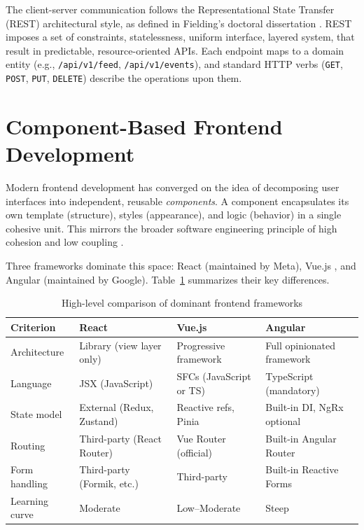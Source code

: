 The client-server communication follows the Representational State Transfer (REST) architectural style, as defined in Fielding's doctoral dissertation \cite{fielding2000rest}. REST imposes a set of constraints, statelessness, uniform interface, layered system, that result in predictable, resource-oriented APIs. Each endpoint maps to a domain entity (e.g., \texttt{/api/v1/feed}, \texttt{/api/v1/events}), and standard HTTP verbs (\texttt{GET}, \texttt{POST}, \texttt{PUT}, \texttt{DELETE}) describe the operations upon them.

\section{Component-Based Frontend Development}

Modern frontend development has converged on the idea of decomposing user interfaces into independent, reusable \textit{components}. A component encapsulates its own template (structure), styles (appearance), and logic (behavior) in a single cohesive unit. This mirrors the broader software engineering principle of high cohesion and low coupling \cite{sommerville2016software}.

Three frameworks dominate this space: React \cite{reactDocs} (maintained by Meta), Vue.js \cite{vueDocs}, and Angular \cite{angularDocs} (maintained by Google). Table~\ref{tab:framework-comparison} summarizes their key differences.

\begin{table}[h]
\centering
\small
\begin{tabularx}{\textwidth}{|l|X|X|X|}
\hline
\textbf{Criterion} & \textbf{React} & \textbf{Vue.js} & \textbf{Angular} \\ \hline
Architecture & Library (view layer only) & Progressive framework & Full opinionated framework \\ \hline
Language & JSX (JavaScript) & SFCs (JavaScript or TS) & TypeScript (mandatory) \\ \hline
State model & External (Redux, Zustand) & Reactive refs, Pinia & Built-in DI, NgRx optional \\ \hline
Routing & Third-party (React Router) & Vue Router (official) & Built-in Angular Router \\ \hline
Form handling & Third-party (Formik, etc.) & Third-party & Built-in Reactive Forms \\ \hline
Learning curve & Moderate & Low--Moderate & Steep \\ \hline
\end{tabularx}
\caption{High-level comparison of dominant frontend frameworks}
\label{tab:framework-comparison}
\end{table}

